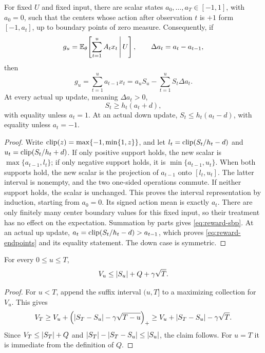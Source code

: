 \begin{lemma}\label{lem:reward-nested}
For fixed $U$ and fixed input, there are scalar states
$a_0,\ldots,a_T\in[-1,1]$, with $a_0=0$, such that the centers whose
action after observation $t$ is $+1$ form $[-1,a_t]$, up to boundary
points of zero measure. Consequently, if
\[
 g_u=\mathbb E_\theta\!\left[\sum_{t=1}^u A_t x_t\,\middle|\,U\right],
 \qquad \Delta a_t=a_t-a_{t-1},
\]
then
\begin{equation}\label{eq:reward-sbp}
 g_u=\sum_{t=1}^u a_{t-1}x_t
     =a_u S_u-\sum_{t=1}^u S_t\Delta a_t.
\end{equation}
At every actual up update, meaning $\Delta a_t>0$,
\begin{equation}\label{eq:reward-endpoints}
 S_t\ge h_t(a_t+d),
\end{equation}
with equality unless $a_t=1$. At an actual down update,
$S_t\le h_t(a_t-d)$, with equality unless $a_t=-1$.
\end{lemma}

\begin{proof}
Write $\operatorname{clip}(z)=\max\{-1,\min\{1,z\}\}$, and let
$l_t=\operatorname{clip}(S_t/h_t-d)$ and $u_t=\operatorname{clip}(S_t/h_t+d)$.
If only positive support holds, the new scalar is
$\max\{a_{t-1},l_t\}$; if only negative support holds, it is
$\min\{a_{t-1},u_t\}$. When both supports hold, the new scalar is the
projection of $a_{t-1}$ onto $[l_t,u_t]$. The latter interval is nonempty,
and the two one-sided operations commute. If neither support holds, the
scalar is unchanged. This proves the interval representation by induction,
starting from $a_0=0$. Its signed action mean is exactly $a_t$.
There are only finitely many center boundary values for this fixed input,
so their treatment has no effect on the expectation. Summation by parts
gives \eqref{eq:reward-sbp}. At an actual up update,
$a_t=\operatorname{clip}(S_t/h_t-d)>a_{t-1}$, which proves
\eqref{eq:reward-endpoints} and its equality statement. The down case is
symmetric.
\end{proof}

\begin{lemma}\label{lem:reward-prefix}
For every $0\le u\le T$,
\begin{equation}\label{eq:reward-prefix}
 V_u\le\left|S_u\right|+Q+\gamma\sqrt T.
\end{equation}
\end{lemma}

\begin{proof}
For $u<T$, append the suffix interval $(u,T]$ to a maximizing collection
for $V_u$. This gives
\[
 V_T\ge V_u+\left(\left|S_T-S_u\right|-\gamma\sqrt{T-u}\right)_+
       \ge V_u+\left|S_T-S_u\right|-\gamma\sqrt T.
\]
Since $V_T\le\left|S_T\right|+Q$ and
$\left|S_T\right|-\left|S_T-S_u\right|\le\left|S_u\right|$, the claim follows.
For $u=T$ it is immediate from the definition of $Q$.
\end{proof}

